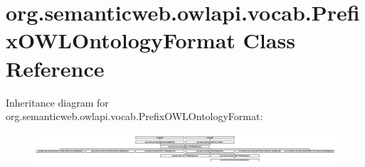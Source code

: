 \hypertarget{classorg_1_1semanticweb_1_1owlapi_1_1vocab_1_1_prefix_o_w_l_ontology_format}{\section{org.\-semanticweb.\-owlapi.\-vocab.\-Prefix\-O\-W\-L\-Ontology\-Format Class Reference}
\label{classorg_1_1semanticweb_1_1owlapi_1_1vocab_1_1_prefix_o_w_l_ontology_format}
}
Inheritance diagram for org.\-semanticweb.\-owlapi.\-vocab.\-Prefix\-O\-W\-L\-Ontology\-Format\-:\begin{figure}[H]
\begin{center}
\leavevmode
\includegraphics[height=1.147541cm]{classorg_1_1semanticweb_1_1owlapi_1_1vocab_1_1_prefix_o_w_l_ontology_format}
\end{center}
\end{figure}
